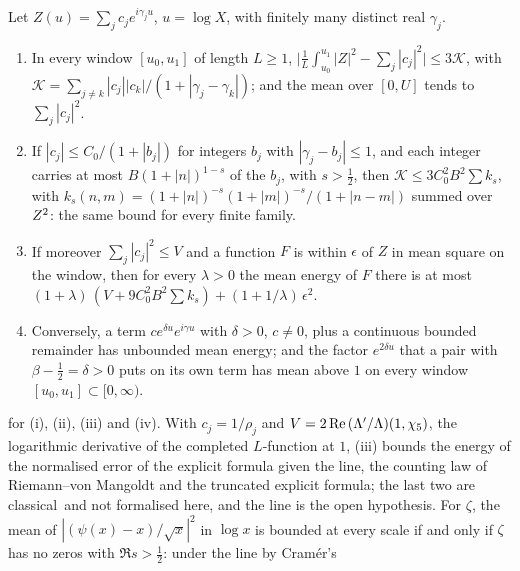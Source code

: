 \begin{proposition}\label{prop:energy-scale}
Let $Z(u)=\sum_jc_je^{i\gamma_ju}$, $u=\log X$, with finitely many distinct real $\gamma_j$.
\begin{enumerate}[label=\textup{(\roman*)}]
  \item In every window $[u_0,u_1]$ of length $L\geq1$,
    $\bigl|\tfrac1L\int_{u_0}^{u_1}|Z|^2-\sum_j|c_j|^2\bigr|\leq3\mathcal K$, with
    $\mathcal K=\sum_{j\neq k}|c_j||c_k|/(1+|\gamma_j-\gamma_k|)$; and the mean over $[0,U]$ tends to
    $\sum_j|c_j|^2$.
  \item If $|c_j|\leq C_0/(1+|b_j|)$ for integers $b_j$ with $|\gamma_j-b_j|\leq1$, and each
    integer carries at most $B(1+|n|)^{1-s}$ of the $b_j$, with $s>\tfrac12$, then
    $\mathcal K\leq3C_0^2B^2\sum k_s$, with $k_s(n,m)=(1+|n|)^{-s}(1+|m|)^{-s}/(1+|n-m|)$ summed over
    $Z^2$: the same bound for every finite family.
  \item If moreover $\sum_j|c_j|^2\leq V$ and a function $F$ is within $\epsilon$ of $Z$ in mean
    square on the window, then for every $\lambda>0$ the mean energy of $F$ there is at most
    $(1+\lambda)\,(V+9C_0^2B^2\sum k_s)+(1+1/\lambda)\,\epsilon^2$.
  \item Conversely, a term $ce^{\delta u}e^{i\gamma u}$ with $\delta>0$, $c\neq0$, plus a
    continuous bounded remainder has unbounded mean energy; and the factor $e^{2\delta u}$ that a pair with
    $\beta-\tfrac12=\delta>0$ puts on its own term has mean above $1$ on every window
    $[u_0,u_1]\subset[0,\infty)$.
\end{enumerate}
{\raggedright \leavevmode{} for (i), (ii), (iii) and (iv).  With $c_j=1/\rho_j$ and
$V=2\operatorname{Re}\,(\Lambda'/\Lambda)(1,\chi_5)$, the logarithmic derivative of the completed $L$-function at $1$, (iii) bounds the energy of the normalised error of the explicit
formula given the line, the counting law of Riemann--von Mangoldt and the truncated explicit
formula; the last two are classical\ and not formalised here, and the line is the
open hypothesis.  For $\zeta$, the mean of $|(\psi(x)-x)/\sqrt x|^2$ in $\log x$ is bounded at every scale
if and only if $\zeta$ has no zeros with $\Re s>\tfrac12$: under the line by Cram\'er's
}
\end{proposition}

